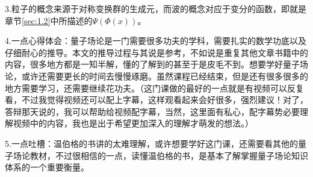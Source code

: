 \documentclass[10pt,a4paper]{article}
\begin{document}
3.粒子的概念来源于对称变换群的生成元，而波的概念对应于变分的函数，即就是章节\ref{sec:1.2}中所描述的$\Psi(\Phi(x))$。

4.一点心得体会：量子场论是一门需要很多功夫的学科，需要扎实的数学功底以及仔细耐心的推导。本文的推导过程与其说是参考，不如说是重复其他文章书籍中的内容，很多地方都是一知半解，懂的了解到的甚至于是皮毛不到。想要学好量子场论，或许还需要更长的时间去慢慢琢磨。虽然课程已经结束，但是还有很多很多的地方需要学习，还需要继续花功夫。（这门课做的最好的一点就是有视频可以反复看，不过我觉得视频还可以配上字幕，这样观看起来会好很多，强烈建议！对了，答辩那天说的，我可以帮助给视频配字幕，当然，这里面有私心，配字幕势必要理解视频中的内容，我也是出于希望更加深入的理解才萌发的想法。）

5.一点吐槽：温伯格的书讲的太难理解，或许想要学好这门课，还需要看其他的量子场论教材，不过很相信的一点，读懂温伯格的书，是基本了解掌握量子场论知识体系的一个重要衡量。


\newpage


\end{document}
